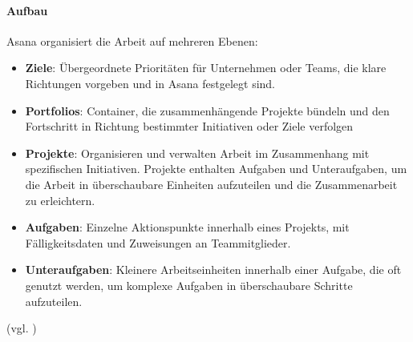 \documentclass[sigconf, nonacm]{acmart}
\begin{document}
\paragraph{Aufbau}
Asana organisiert die Arbeit auf mehreren Ebenen:
\begin{itemize}
\item \textbf{Ziele}: Übergeordnete Prioritäten für Unternehmen oder Teams, die klare Richtungen vorgeben und in Asana festgelegt sind.
\item \textbf{Portfolios}: Container, die zusammenhängende Projekte bündeln und den Fortschritt in Richtung bestimmter Initiativen oder Ziele verfolgen
\item \textbf{Projekte}: Organisieren und verwalten Arbeit im Zusammenhang mit spezifischen Initiativen. Projekte enthalten Aufgaben und Unteraufgaben, um die Arbeit in überschaubare Einheiten aufzuteilen und die Zusammenarbeit zu erleichtern.
\item \textbf{Aufgaben}: Einzelne Aktionspunkte innerhalb eines Projekts, mit Fälligkeitsdaten und Zuweisungen an Teammitglieder.
\item \textbf{Unteraufgaben}: Kleinere Arbeitseinheiten innerhalb einer Aufgabe, die oft genutzt werden, um komplexe Aufgaben in überschaubare Schritte aufzuteilen.
\end{itemize}
(vgl. \citep{noauthor_mit_nodate})
\end{document}
